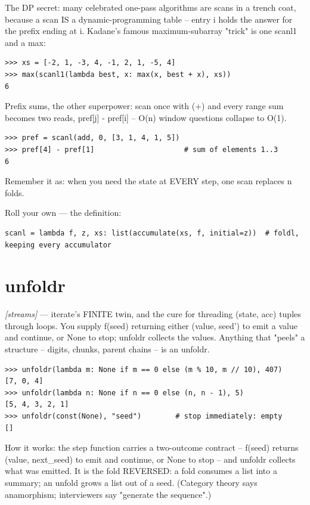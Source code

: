 \documentclass[11pt,letterpaper]{book}
\begin{document}
The DP secret: many celebrated one-pass algorithms are scans in a trench coat, because a scan IS a dynamic-programming table -- entry i holds the answer for the prefix ending at i. Kadane's famous maximum-subarray "trick" is one scanl1 and a max:

\begin{lstlisting}[style=spec]
>>> xs = [-2, 1, -3, 4, -1, 2, 1, -5, 4]
>>> max(scanl1(lambda best, x: max(x, best + x), xs))
6
\end{lstlisting}

Prefix sums, the other superpower: scan once with (+) and every range sum becomes two reads, pref[j] - pref[i] -- O(n) window questions collapse to O(1).

\begin{lstlisting}[style=spec]
>>> pref = scanl(add, 0, [3, 1, 4, 1, 5])
>>> pref[4] - pref[1]                     # sum of elements 1..3
6
\end{lstlisting}

Remember it as: when you need the state at EVERY step, one scan replaces n folds.


Roll your own --- the definition:

\begin{lstlisting}[style=code]
scanl = lambda f, z, xs: list(accumulate(xs, f, initial=z))  # foldl, keeping every accumulator
\end{lstlisting}

\section{unfoldr}
\noindent\textit{[streams]} --- iterate's FINITE twin, and the cure for threading (state, acc) tuples through loops. You supply f(seed) returning either (value, seed') to emit a value and continue, or None to stop; unfoldr collects the values. Anything that "peels" a structure -- digits, chunks, parent chains -- is an unfoldr.
\begin{lstlisting}[style=spec]
>>> unfoldr(lambda m: None if m == 0 else (m % 10, m // 10), 407)
[7, 0, 4]
>>> unfoldr(lambda n: None if n == 0 else (n, n - 1), 5)
[5, 4, 3, 2, 1]
>>> unfoldr(const(None), "seed")        # stop immediately: empty
[]
\end{lstlisting}

How it works: the step function carries a two-outcome contract -- f(seed) returns (value, next\_seed) to emit and continue, or None to stop -- and unfoldr collects what was emitted. It is the fold REVERSED: a fold consumes a list into a summary; an unfold grows a list out of a seed. (Category theory says anamorphism; interviewers say "generate the sequence".)
\end{document}

